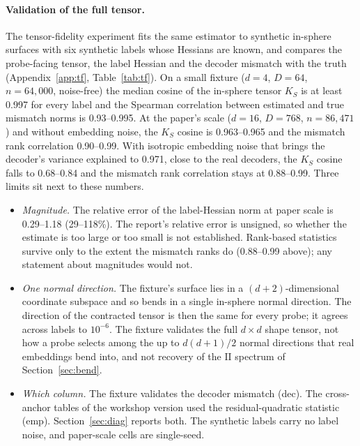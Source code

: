 \documentclass[10pt]{article}
\newcommand{\II}{\mathrm{II}}
\begin{document}
\paragraph{Validation of the full tensor.} The tensor-fidelity experiment fits the same estimator to synthetic in-sphere surfaces with six synthetic labels whose Hessians are known, and compares the probe-facing tensor, the label Hessian and the decoder mismatch with the truth (Appendix~\ref{app:tf}, Table~\ref{tab:tf}).
On a small fixture ($d=4$, $D=64$, $n=64{,}000$, noise-free) the median cosine of the in-sphere tensor $K_S$ is at least 0.997 for every label and the Spearman correlation between estimated and true mismatch norms is 0.93--0.995. At the paper's scale ($d=16$, $D=768$, $n=86{,}471$) and without embedding noise, the $K_S$ cosine is 0.963--0.965 and the mismatch rank correlation 0.90--0.99. With isotropic embedding noise that brings the decoder's variance explained to 0.971, close to the real decoders, the $K_S$ cosine falls to 0.68--0.84 and the mismatch rank correlation stays at 0.88--0.99. Three limits sit next to these numbers.
\begin{itemize}
\item \emph{Magnitude.} The relative error of the label-Hessian norm at paper scale is 0.29--1.18 (29--118\%). The report's relative error is unsigned, so whether the estimate is too large or too small is not established. %
Rank-based statistics survive only to the extent the mismatch ranks do (0.88--0.99 above); any statement about magnitudes would not.
\item \emph{One normal direction.} The fixture's surface lies in a $(d+2)$-dimensional coordinate subspace and so bends in a single in-sphere normal direction. The direction of the contracted tensor is then the same for every probe; it agrees across labels to $10^{-6}$. %
The fixture validates the full $d\times d$ shape tensor, not how a probe selects among the up to $d(d+1)/2$ normal directions that real embeddings bend into, and not recovery of the $\II$ spectrum of Section~\ref{sec:bend}.
\item \emph{Which column.} The fixture validates the decoder mismatch (dec). The cross-anchor tables of the workshop version used the residual-quadratic statistic (emp). Section~\ref{sec:diag} reports both. The synthetic labels carry no label noise, and paper-scale cells are single-seed.
\end{itemize}
\end{document}
